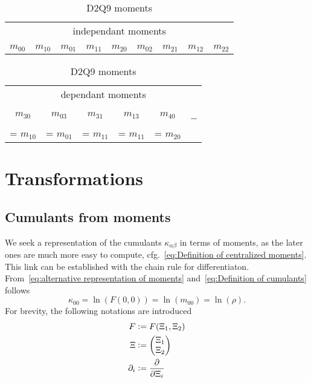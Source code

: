 \documentclass{article}
\begin{document}
\begin{table} [h!]
  \centering
  \begin{tabular}{c cc ccc cc c}
    \toprule
    \multicolumn{9}{c}{independant moments}  \\
    \cmidrule(lr){1-9} \\
    $m_{00}$   &   $m_{10}$ & $m_{01}$   &   $m_{11}$ & $m_{20}$ & $m_{02}$   &   $m_{21}$ & $m_{12}$   &   $m_{22}$ \\
    \bottomrule
  \end{tabular}
  \newline
  \vspace*{.5 cm}
  \newline
  \begin{tabular}{ccccc c}
    \toprule
    \multicolumn{6}{c}{dependant moments}   \\
    \cmidrule(lr){1-5}   \\
    $m_{30}$   & $m_{03}$   & $m_{31}$  & $m_{13}$  & $m_{40}$  & \ldots \\
    = $m_{10}$ & = $m_{01}$ & = $m_{11}$ & = $m_{11}$ & = $m_{20}$ & \\
    \bottomrule
  \end{tabular}
  \caption{D2Q9 moments}\label{table:D2Q9 moments}
\end{table}


\section{Transformations}
\label{sec:Transformations}

\subsection{Cumulants from moments}
\label{sub:Cumulants from moments}

We seek a representation of the cumulants $\kappa_{\alpha\beta}$ in terms of moments, as the later ones are much more easy to compute, cfg.~\eqref{eq:Definition of centralized moments}. This link can be established with the chain rule for differentiaton.
From~\eqref{eq:alternative representation of moments} and~\eqref{eq:Definition of cumulants} follows
\begin{equation}
  \kappa_{00} = \ln(F(0,0)) = \ln(m_{00}) = \ln(\rho).
\end{equation}
For brevity, the following notations are introduced
\begin{equation}
  \label{eq:abbreviations for deriving cumulants from moments}
  \begin{aligned}
    F & \mathrel{\mathop:}= F(\Xi_1, \Xi_2) \\
    \Xi &\mathrel{\mathop:}= \begin{pmatrix}\Xi_1 \\ \Xi_2  \end{pmatrix} \\
    \partial_i &\mathrel{\mathop:}= \frac{\partial}{\partial \Xi_i}
  \end{aligned}
\end{equation}
\end{document}
